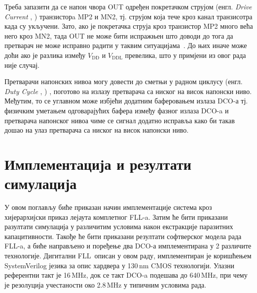 \documentclass[master]{finthesis}
\makeatletter
\newcommand*{\engl}[2][\@empty]{%
    \edef\theacronym{#1}%
    (енгл. \foreignlanguage{english}{\emph{#2}%
    \ifx\theacronym\@empty \else , #1\fi})%
}
\def \FLL  {FLL} %
\def \DCO  {DCO} %
\makeatother
\begin{document}
Треба запазити да се напон чвора OUT одређен покретачком струјом \engl{Drive Current} транзисторa MP2 и MN2, тј. струјом која тече кроз канал транзисотра када су укључени. Зато, ако је покретачка струја кроз транзистор MP2 много већа него кроз MN2, тада OUT не може бити испражњен што доводи до тога да претварач не може исправно радити у таквим ситуацијама~\cite{Osaki:6198744}. До њих иначе може доћи ако је разлика између $V_\text{DD}$ и $V_\text{DDL}$ превелика, што у примјени из овог рада није случај. \par
Претварачи напонских нивоа могу довести до сметњи у радном циклусу \engl{Duty Cycle}, поготово на излазу претварача са ниског на висок напонски ниво. Међутим, то се углавном може избјећи додатним баферовањем излаза \DCO-а тј. физичким уметањем одговарајућих бафера између фазног излаза \DCO-a и претварача напонског нивоа чиме се сигнал додатно исправља како би такав дошао на улаз претварача са ниског на висок напонски ниво.


\section{Имплементација и резултати симулација} \label{Implementation and results}
У овом поглављу биће приказан начин имплементације система кроз хијерархијски приказ лејаута комплетног \FLL-a. Затим ће бити приказани разултати симулација у различитим условима након екстракције паразитних капацитивности. Такође ће бити приказани резултати софтверског модела рада \FLL-a, а биће направљено и поређење два \DCO-а имплементирана у 2 различите технологије. Дигитални \FLL\ описан у овом раду, имплементиран је коришћењем SystemVerilog језика за опис хардвера у 130\,nm CMOS технологији. Улазни референтни такт је 16\,MHz, док се такт \DCO-a подешава до 640\,MHz, при чему је резолуција учестаности око 2.8\,MHz у типичним условима рада. 
\end{document}
